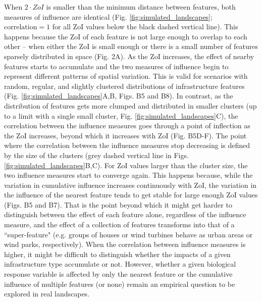 \documentclass[titlepage]{article}
\begin{document}
When $2 \cdot ZoI$ is smaller than the minimum distance between features, both measures of influence are identical (Fig. \ref{fig:simulated_landscapes}; $\text{correlation} = 1$ for all ZoI values below the black dashed vertical line). This happens because the ZoI of each feature is not large enough to overlap to each other -- when either the ZoI is small enough or  there is a small number of features sparsely distributed in space (Fig. 2A). As the ZoI increases, the effect of nearby features starts to accumulate and the two measures of influence begin to represent different patterns of spatial variation. This is valid for scenarios with random, regular, and slightly clustered distributions of infrastructure features (Fig. \ref{fig:simulated_landscapes}A,B, Figs. B5 and B8). In contrast, as the distribution of features gets more clumped and distributed in smaller clusters (up to a limit with a single small cluster, Fig. \ref{fig:simulated_landscapes}C), the correlation between the influence measures goes through a point of inflection as the ZoI increases, beyond which it increases with ZoI (Fig. B5D-F). The point where the correlation between the influence measures stop decreasing is defined by the size of the clusters (grey dashed vertical line in Figs. \ref{fig:simulated_landscapes}B,C). For ZoI values larger than the cluster size, the two influence measures start to converge again. This happens because, while the variation in cumulative influence increases continuously with ZoI, the variation in the influence of the nearest feature tends to get stable for large enough ZoI values (Figs. B5 and B7). That is the point beyond which it might get harder to distinguish between the effect of each feature alone, regardless of the influence measure, and the effect of a collection of features transforms into that of a ``super-feature" (e.g. groups of houses or wind turbines behave as urban areas or wind parks, respectively). 
When the correlation between influence measures is higher, it might be difficult to distinguish whether the impacts of a given infrastructure type accumulate or not. 
However, whether a given biological response variable is affected by only the nearest feature or the cumulative influence of multiple features (or none) remain an empirical question to be explored in real landscapes. 
\end{document}

